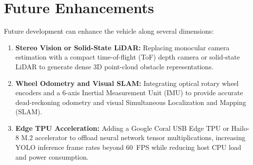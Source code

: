 \section{Future Enhancements}
Future development can enhance the vehicle along several dimensions:
\begin{enumerate}
    \item \textbf{Stereo Vision or Solid-State LiDAR:} Replacing monocular camera estimation with a compact time-of-flight (ToF) depth camera or solid-state LiDAR to generate dense 3D point-cloud obstacle representations.
    \item \textbf{Wheel Odometry and Visual SLAM:} Integrating optical rotary wheel encoders and a 6-axis Inertial Measurement Unit (IMU) to provide accurate dead-reckoning odometry and visual Simultaneous Localization and Mapping (SLAM).
    \item \textbf{Edge TPU Acceleration:} Adding a Google Coral USB Edge TPU or Hailo-8 M.2 accelerator to offload neural network tensor multiplications, increasing YOLO inference frame rates beyond 60~FPS while reducing host CPU load and power consumption.
\end{enumerate}
